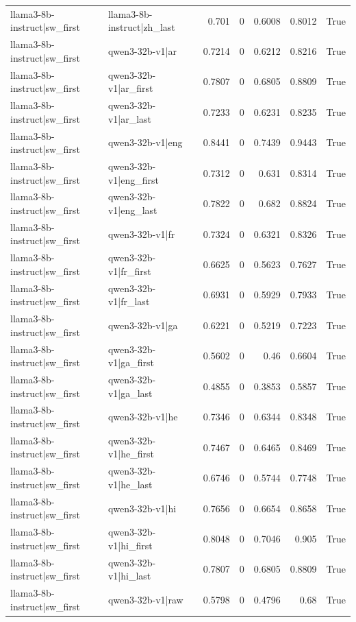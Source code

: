 \begin{table}
\begin{tabular}{l l r r r r l}
llama3-8b-instruct|sw_first & llama3-8b-instruct|zh_last & 0.701 & 0 & 0.6008 & 0.8012 & True \\
llama3-8b-instruct|sw_first & qwen3-32b-v1|ar & 0.7214 & 0 & 0.6212 & 0.8216 & True \\
llama3-8b-instruct|sw_first & qwen3-32b-v1|ar_first & 0.7807 & 0 & 0.6805 & 0.8809 & True \\
llama3-8b-instruct|sw_first & qwen3-32b-v1|ar_last & 0.7233 & 0 & 0.6231 & 0.8235 & True \\
llama3-8b-instruct|sw_first & qwen3-32b-v1|eng & 0.8441 & 0 & 0.7439 & 0.9443 & True \\
llama3-8b-instruct|sw_first & qwen3-32b-v1|eng_first & 0.7312 & 0 & 0.631 & 0.8314 & True \\
llama3-8b-instruct|sw_first & qwen3-32b-v1|eng_last & 0.7822 & 0 & 0.682 & 0.8824 & True \\
llama3-8b-instruct|sw_first & qwen3-32b-v1|fr & 0.7324 & 0 & 0.6321 & 0.8326 & True \\
llama3-8b-instruct|sw_first & qwen3-32b-v1|fr_first & 0.6625 & 0 & 0.5623 & 0.7627 & True \\
llama3-8b-instruct|sw_first & qwen3-32b-v1|fr_last & 0.6931 & 0 & 0.5929 & 0.7933 & True \\
llama3-8b-instruct|sw_first & qwen3-32b-v1|ga & 0.6221 & 0 & 0.5219 & 0.7223 & True \\
llama3-8b-instruct|sw_first & qwen3-32b-v1|ga_first & 0.5602 & 0 & 0.46 & 0.6604 & True \\
llama3-8b-instruct|sw_first & qwen3-32b-v1|ga_last & 0.4855 & 0 & 0.3853 & 0.5857 & True \\
llama3-8b-instruct|sw_first & qwen3-32b-v1|he & 0.7346 & 0 & 0.6344 & 0.8348 & True \\
llama3-8b-instruct|sw_first & qwen3-32b-v1|he_first & 0.7467 & 0 & 0.6465 & 0.8469 & True \\
llama3-8b-instruct|sw_first & qwen3-32b-v1|he_last & 0.6746 & 0 & 0.5744 & 0.7748 & True \\
llama3-8b-instruct|sw_first & qwen3-32b-v1|hi & 0.7656 & 0 & 0.6654 & 0.8658 & True \\
llama3-8b-instruct|sw_first & qwen3-32b-v1|hi_first & 0.8048 & 0 & 0.7046 & 0.905 & True \\
llama3-8b-instruct|sw_first & qwen3-32b-v1|hi_last & 0.7807 & 0 & 0.6805 & 0.8809 & True \\
llama3-8b-instruct|sw_first & qwen3-32b-v1|raw & 0.5798 & 0 & 0.4796 & 0.68 & True \\

\end{tabular}
\end{table}
